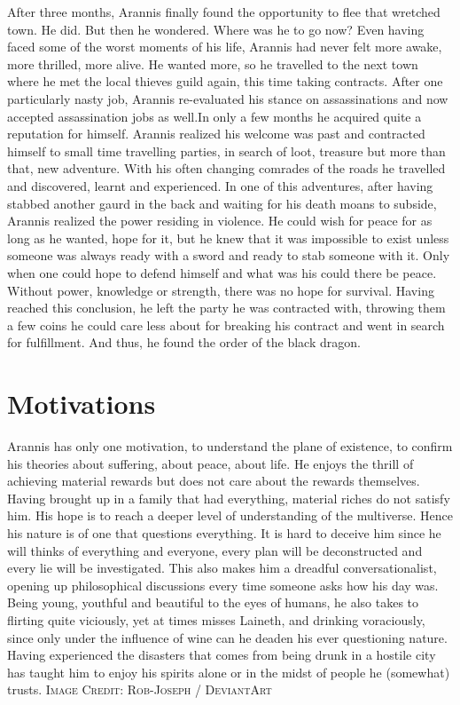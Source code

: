 \documentclass{article}
\begin{document}
After three months, Arannis finally found the opportunity to flee that wretched town. He did. But then he wondered. Where was he to go now? Even having faced some of the worst moments of his life, Arannis had never felt more awake, more thrilled, more alive. He wanted more, so he travelled to the next town where he met the local thieves guild again, this time taking contracts. 
After one particularly nasty job, Arannis re-evaluated his stance on assassinations and now accepted assassination jobs as well.In only a few months he acquired quite a reputation for himself. Arannis realized his welcome was past and contracted himself to small time travelling parties, in search of loot, treasure but more than that, new adventure. With his often changing comrades of the roads he travelled and discovered, learnt and experienced.
In one of this adventures, after having stabbed another gaurd in the back and waiting for his death moans to subside, Arannis realized the power residing in violence. He could wish for peace for as long as he wanted, hope for it, but he knew that it was impossible to exist unless someone was always ready with a sword and ready to stab someone with it. Only when one could hope to defend himself and what was his could there be peace. Without power, knowledge or strength, there was no hope for survival. Having reached this conclusion, he left the party he was contracted with, throwing them a few coins he could care less about for breaking his contract and went in search for fulfillment. And thus, he found the order of the black dragon.
\section{Motivations}
Arannis has only one motivation, to understand the plane of existence, to confirm his theories about suffering, about peace, about life. He enjoys the thrill of achieving material rewards but does not care about the rewards themselves. Having brought up in a family that had everything, material riches do not satisfy him. His hope is to reach a deeper level of understanding of the multiverse.
Hence his nature is of one that questions everything. It is hard to deceive him since he will thinks of everything and everyone, every plan will be deconstructed and every lie will be investigated. This also makes him a dreadful conversationalist, opening up philosophical discussions every time someone asks how his day was. Being young, youthful and beautiful to the eyes of humans, he also takes to flirting quite viciously, yet at times misses Laineth, and drinking voraciously, since only under the influence of wine can he deaden his ever questioning nature. Having experienced the disasters that comes from being drunk in a hostile city has taught him to enjoy his spirits alone or in the midst of people he (somewhat) trusts. 
\textsc{Image Credit: Rob-Joseph / DeviantArt}
\end{document}
